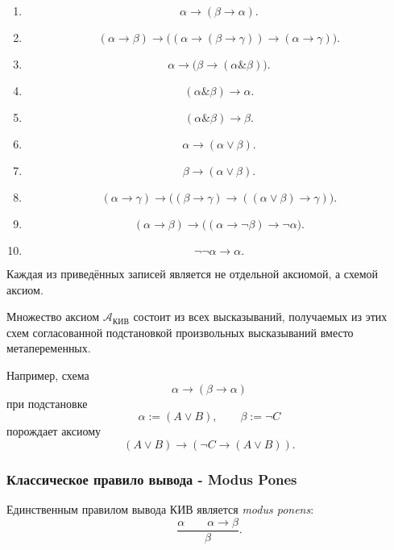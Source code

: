 \documentclass[12pt,a4paper,oneside,openany]{book}
\theoremstyle{definition}
\theoremstyle{plain}
\theoremstyle{remark}
\begin{document}
\begin{enumerate}[label=\textup{K\arabic*.}]
    \item
    \[
    \alpha\to(\beta\to\alpha).
    \]

    \item
    \[
    (\alpha\to\beta)
    \to
    \bigl(
        (\alpha\to(\beta\to\gamma))
        \to
        (\alpha\to\gamma)
    \bigr).
    \]

    \item
    \[
    \alpha\to\bigl(\beta\to
    (\alpha\mathbin{\&}\beta)\bigr).
    \]

    \item
    \[
    (\alpha\mathbin{\&}\beta)\to\alpha.
    \]

    \item
    \[
    (\alpha\mathbin{\&}\beta)\to\beta.
    \]

    \item
    \[
    \alpha\to(\alpha\lor\beta).
    \]

    \item
    \[
    \beta\to(\alpha\lor\beta).
    \]

    \item
    \[
    (\alpha\to\gamma)
    \to
    \bigl(
        (\beta\to\gamma)
        \to
        ((\alpha\lor\beta)\to\gamma)
    \bigr).
    \]

    \item
    \[
    (\alpha\to\beta)
    \to
    \bigl(
        (\alpha\to\neg\beta)
        \to
        \neg\alpha
    \bigr).
    \]

    \item
    \[
    \neg\neg\alpha\to\alpha.
    \]
\end{enumerate}

Каждая из приведённых записей является не отдельной аксиомой, а схемой
аксиом.

Множество аксиом \(\mathcal{A}_{\mathrm{КИВ}}\) состоит из всех
высказываний, получаемых из этих схем согласованной подстановкой
произвольных высказываний вместо метапеременных.

Например, схема
\[
\alpha\to(\beta\to\alpha)
\]
при подстановке
\[
\alpha:=(A\lor B),
\qquad
\beta:=\neg C
\]
порождает аксиому
\[
(A\lor B)\to(\neg C\to(A\lor B)).
\]

\vspace{7mm}
\subsubsection{Классическое правило вывода - Modus Pones}
Единственным правилом вывода КИВ является
\textit{modus ponens}:
\[
\frac{\alpha\qquad\alpha\to\beta}{\beta}.
\]
\end{document}
